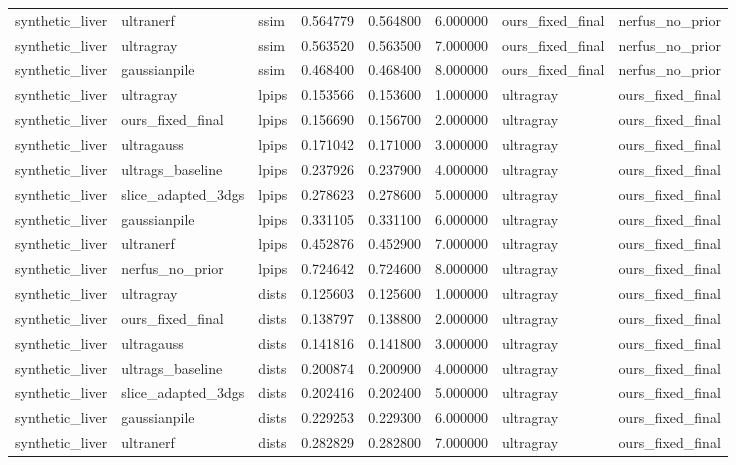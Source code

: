 \begin{tabular}{llllllll}
synthetic\_liver & ultranerf & ssim & 0.564779 & 0.564800 & 6.000000 & ours\_fixed\_final & nerfus\_no\_prior \\
synthetic\_liver & ultragray & ssim & 0.563520 & 0.563500 & 7.000000 & ours\_fixed\_final & nerfus\_no\_prior \\
synthetic\_liver & gaussianpile & ssim & 0.468400 & 0.468400 & 8.000000 & ours\_fixed\_final & nerfus\_no\_prior \\
synthetic\_liver & ultragray & lpips & 0.153566 & 0.153600 & 1.000000 & ultragray & ours\_fixed\_final \\
synthetic\_liver & ours\_fixed\_final & lpips & 0.156690 & 0.156700 & 2.000000 & ultragray & ours\_fixed\_final \\
synthetic\_liver & ultragauss & lpips & 0.171042 & 0.171000 & 3.000000 & ultragray & ours\_fixed\_final \\
synthetic\_liver & ultrags\_baseline & lpips & 0.237926 & 0.237900 & 4.000000 & ultragray & ours\_fixed\_final \\
synthetic\_liver & slice\_adapted\_3dgs & lpips & 0.278623 & 0.278600 & 5.000000 & ultragray & ours\_fixed\_final \\
synthetic\_liver & gaussianpile & lpips & 0.331105 & 0.331100 & 6.000000 & ultragray & ours\_fixed\_final \\
synthetic\_liver & ultranerf & lpips & 0.452876 & 0.452900 & 7.000000 & ultragray & ours\_fixed\_final \\
synthetic\_liver & nerfus\_no\_prior & lpips & 0.724642 & 0.724600 & 8.000000 & ultragray & ours\_fixed\_final \\
synthetic\_liver & ultragray & dists & 0.125603 & 0.125600 & 1.000000 & ultragray & ours\_fixed\_final \\
synthetic\_liver & ours\_fixed\_final & dists & 0.138797 & 0.138800 & 2.000000 & ultragray & ours\_fixed\_final \\
synthetic\_liver & ultragauss & dists & 0.141816 & 0.141800 & 3.000000 & ultragray & ours\_fixed\_final \\
synthetic\_liver & ultrags\_baseline & dists & 0.200874 & 0.200900 & 4.000000 & ultragray & ours\_fixed\_final \\
synthetic\_liver & slice\_adapted\_3dgs & dists & 0.202416 & 0.202400 & 5.000000 & ultragray & ours\_fixed\_final \\
synthetic\_liver & gaussianpile & dists & 0.229253 & 0.229300 & 6.000000 & ultragray & ours\_fixed\_final \\
synthetic\_liver & ultranerf & dists & 0.282829 & 0.282800 & 7.000000 & ultragray & ours\_fixed\_final \\

\end{tabular}
